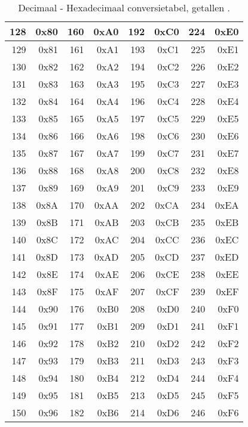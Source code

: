 \begin{table}[h!]
\caption{Decimaal - Hexadecimaal conversietabel, getallen .}
\label{tab:hexconv2}
\renewcommand{\arraystretch}{1.0}
\centering
\ttfamily
\begin{tabular}{|>{\color{red}}rr||>{\color{red}}rr||>{\color{red}}rr||>{\color{red}}rr|}
\hline
128 & 0x80 & 160 & 0xA0 & 192 & 0xC0 & 224 & 0xE0 \\
\hline
129 & 0x81 & 161 & 0xA1 & 193 & 0xC1 & 225 & 0xE1 \\
\hline
130 & 0x82 & 162 & 0xA2 & 194 & 0xC2 & 226 & 0xE2 \\
\hline
131 & 0x83 & 163 & 0xA3 & 195 & 0xC3 & 227 & 0xE3 \\
\hline
132 & 0x84 & 164 & 0xA4 & 196 & 0xC4 & 228 & 0xE4 \\
\hline
133 & 0x85 & 165 & 0xA5 & 197 & 0xC5 & 229 & 0xE5 \\
\hline
134 & 0x86 & 166 & 0xA6 & 198 & 0xC6 & 230 & 0xE6 \\
\hline
135 & 0x87 & 167 & 0xA7 & 199 & 0xC7 & 231 & 0xE7 \\
\hline
136 & 0x88 & 168 & 0xA8 & 200 & 0xC8 & 232 & 0xE8 \\
\hline
137 & 0x89 & 169 & 0xA9 & 201 & 0xC9 & 233 & 0xE9 \\
\hline
138 & 0x8A & 170 & 0xAA & 202 & 0xCA & 234 & 0xEA \\
\hline
139 & 0x8B & 171 & 0xAB & 203 & 0xCB & 235 & 0xEB \\
\hline
140 & 0x8C & 172 & 0xAC & 204 & 0xCC & 236 & 0xEC \\
\hline
141 & 0x8D & 173 & 0xAD & 205 & 0xCD & 237 & 0xED \\
\hline
142 & 0x8E & 174 & 0xAE & 206 & 0xCE & 238 & 0xEE \\
\hline
143 & 0x8F & 175 & 0xAF & 207 & 0xCF & 239 & 0xEF \\
\hline
144 & 0x90 & 176 & 0xB0 & 208 & 0xD0 & 240 & 0xF0 \\
\hline
145 & 0x91 & 177 & 0xB1 & 209 & 0xD1 & 241 & 0xF1 \\
\hline
146 & 0x92 & 178 & 0xB2 & 210 & 0xD2 & 242 & 0xF2 \\
\hline
147 & 0x93 & 179 & 0xB3 & 211 & 0xD3 & 243 & 0xF3 \\
\hline
148 & 0x94 & 180 & 0xB4 & 212 & 0xD4 & 244 & 0xF4 \\
\hline
149 & 0x95 & 181 & 0xB5 & 213 & 0xD5 & 245 & 0xF5 \\
\hline
150 & 0x96 & 182 & 0xB6 & 214 & 0xD6 & 246 & 0xF6 \\

\end{tabular}
\end{table}
